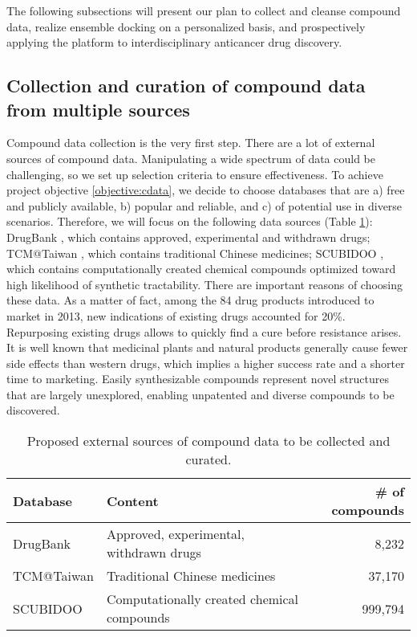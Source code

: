 \documentclass[a4paper,12pt]{article}
\begin{document}
The following subsections will present our plan to collect and cleanse compound data, realize ensemble docking on a personalized basis, and prospectively applying the platform to interdisciplinary anticancer drug discovery.

\subsection*{Collection and curation of compound data from multiple sources}

Compound data collection is the very first step. There are a lot of external sources of compound data. Manipulating a wide spectrum of data could be challenging, so we set up selection criteria to ensure effectiveness. To achieve project objective \ref{objective:cdata}, we decide to choose databases that are a) free and publicly available, b) popular and reliable, and c) of potential use in diverse scenarios. Therefore, we will focus on the following data sources (Table \ref{table:cdata}): DrugBank \citep{1594}, which contains approved, experimental and withdrawn drugs; TCM@Taiwan \citep{528}, which contains traditional Chinese medicines; SCUBIDOO \citep{1682}, which contains computationally created chemical compounds optimized toward high likelihood of synthetic tractability. There are important reasons of choosing these data. As a matter of fact, among the 84 drug products introduced to market in 2013, new indications of existing drugs accounted for 20\%. Repurposing existing drugs allows to quickly find a cure before resistance arises. It is well known that medicinal plants and natural products generally cause fewer side effects than western drugs, which implies a higher success rate and a shorter time to marketing. Easily synthesizable compounds represent novel structures that are largely unexplored, enabling unpatented and diverse compounds to be discovered.

\begin{table}
\caption{Proposed external sources of compound data to be collected and curated.}
\label{table:cdata}
\begin{tabular}{llr}
  \hline
  Database & Content & \# of compounds\\
  \hline
  DrugBank & Approved, experimental, withdrawn drugs & 8,232\\
  TCM@Taiwan & Traditional Chinese medicines & 37,170\\
  SCUBIDOO & Computationally created chemical compounds & 999,794\\
  \hline
\end{tabular}
\end{table}
\end{document}
